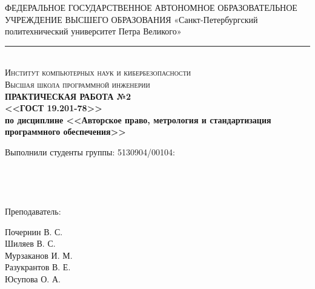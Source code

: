 \documentclass[a4paper, 14pt]{article}
\begin{document}
\begin{titlepage}
    \center

    ФЕДЕРАЛЬНОЕ ГОСУДАРСТВЕННОЕ АВТОНОМНОЕ ОБРАЗОВАТЕЛЬНОЕ УЧРЕЖДЕНИЕ ВЫСШЕГО ОБРАЗОВАНИЯ\linebreak
    «Санкт-Петербургский политехнический университет Петра Великого»
    \noindent\rule{500pt}{0.8pt} \\
    \textsc{\Large Институт компьютерных наук и кибербезопасности}\\
    \textsc{\large Высшая школа программной инженерии}\\[8.0cm]

    { \huge \bfseries ПРАКТИЧЕСКАЯ РАБОТА №2	\\
    \Large \mdseries <<ГОСТ 19.201-78>> \\
    \large по дисциплине <<Авторское право, метрология и стандартизация программного обеспечения>>}\\
    \flushright{
        {\phantom{qwe}}\\[8.0cm]
    }

    \begin{multicols}{2}
        \begin{flushright} \large

            {Выполнили студенты группы: 5130904/00104:}\\
            {\phantom{qwe}}\\
            {\phantom{qwe}}\\
            {\phantom{qwe}}\\
            {\phantom{qwe}}\\

            {Преподаватель:\\}

        \end{flushright}
        \begin{flushright}

            {Почернин В. С.}\\
            {Шиляев В. С.}\\
            {Мурзаканов И. М.}\\
            {Разукрантов В. Е.}\\[0.5cm]


            Юсупова О. А.\\

        \end{flushright}
    \end{multicols}

    \flushright{
        {\phantom{qwe}}\\[0.5cm]
    }

    \vfill
\end{titlepage}
\end{document}
